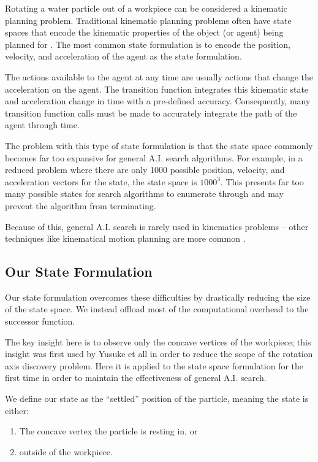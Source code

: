 Rotating a water particle out of a workpiece can be considered a kinematic planning problem. Traditional kinematic planning problems often have state spaces that encode the kinematic properties of the object (or agent) being planned for \cite{plot}. The most common state formulation is to encode the position, velocity, and acceleration of the agent as the state formulation.

The actions available to the agent at any time are usually actions that change the acceleration on the agent. The transition function integrates this kinematic state and acceleration change in time with a pre-defined accuracy. Consequently, many transition function calls must be made to accurately integrate the path of the agent through time.

The problem with this type of state formulation is that the state space commonly becomes far too expansive for general A.I. search algorithms. For example, in a reduced problem where there are only 1000 possible position, velocity, and acceleration vectors for the state, the state space is $1000^3$. This presents far too many possible states for search algorithms to enumerate through and may prevent the algorithm from terminating.

Because of this, general A.I. search is rarely used in kinematics problems -- other techniques like kinematical motion planning are more common \cite{plot}.

	\subsection{Our State Formulation}

Our state formulation overcomes these difficulties by drastically reducing the size of the state space. We instead offload most of the computational overhead to the successor function.

The key insight here is to observe only the concave vertices of the workpiece; this insight was first used by Yusuke et all \cite{plot} in order to reduce the scope of the rotation axis discovery problem. Here it is applied to the state space formulation for the first time in order to maintain the effectiveness of general A.I. search.

We define our state as the ``settled'' position of the particle, meaning the state is either:

\begin{enumerate}
\item The concave vertex the particle is resting in, or
\item outside of the workpiece.
\end{enumerate}

